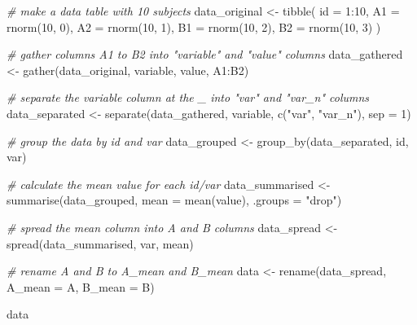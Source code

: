 \documentclass[
  oneside]{book}
\newenvironment{Shaded}{\begin{snugshade}}{\end{snugshade}}
\newcommand{\AttributeTok}[1]{\textcolor[rgb]{0.77,0.63,0.00}{#1}}
\newcommand{\CommentTok}[1]{\textcolor[rgb]{0.56,0.35,0.01}{\textit{#1}}}
\newcommand{\DecValTok}[1]{\textcolor[rgb]{0.00,0.00,0.81}{#1}}
\newcommand{\FunctionTok}[1]{\textcolor[rgb]{0.00,0.00,0.00}{#1}}
\newcommand{\NormalTok}[1]{#1}
\newcommand{\OtherTok}[1]{\textcolor[rgb]{0.56,0.35,0.01}{#1}}
\newcommand{\SpecialCharTok}[1]{\textcolor[rgb]{0.00,0.00,0.00}{#1}}
\newcommand{\StringTok}[1]{\textcolor[rgb]{0.31,0.60,0.02}{#1}}
\begin{document}
\begin{Shaded}
\begin{Highlighting}[]
\CommentTok{\# make a data table with 10 subjects}
\NormalTok{data\_original }\OtherTok{\textless{}{-}} \FunctionTok{tibble}\NormalTok{(}
  \AttributeTok{id =} \DecValTok{1}\SpecialCharTok{:}\DecValTok{10}\NormalTok{,}
  \AttributeTok{A1 =} \FunctionTok{rnorm}\NormalTok{(}\DecValTok{10}\NormalTok{, }\DecValTok{0}\NormalTok{),}
  \AttributeTok{A2 =} \FunctionTok{rnorm}\NormalTok{(}\DecValTok{10}\NormalTok{, }\DecValTok{1}\NormalTok{),}
  \AttributeTok{B1 =} \FunctionTok{rnorm}\NormalTok{(}\DecValTok{10}\NormalTok{, }\DecValTok{2}\NormalTok{),}
  \AttributeTok{B2 =} \FunctionTok{rnorm}\NormalTok{(}\DecValTok{10}\NormalTok{, }\DecValTok{3}\NormalTok{)}
\NormalTok{)}

\CommentTok{\# gather columns A1 to B2 into "variable" and "value" columns}
\NormalTok{data\_gathered }\OtherTok{\textless{}{-}} \FunctionTok{gather}\NormalTok{(data\_original, variable, value, A1}\SpecialCharTok{:}\NormalTok{B2)}

\CommentTok{\# separate the variable column at the \_ into "var" and "var\_n" columns}
\NormalTok{data\_separated }\OtherTok{\textless{}{-}} \FunctionTok{separate}\NormalTok{(data\_gathered, variable, }\FunctionTok{c}\NormalTok{(}\StringTok{"var"}\NormalTok{, }\StringTok{"var\_n"}\NormalTok{), }\AttributeTok{sep =} \DecValTok{1}\NormalTok{)}

\CommentTok{\# group the data by id and var}
\NormalTok{data\_grouped }\OtherTok{\textless{}{-}} \FunctionTok{group\_by}\NormalTok{(data\_separated, id, var)}

\CommentTok{\# calculate the mean value for each id/var }
\NormalTok{data\_summarised }\OtherTok{\textless{}{-}} \FunctionTok{summarise}\NormalTok{(data\_grouped, }\AttributeTok{mean =} \FunctionTok{mean}\NormalTok{(value), }\AttributeTok{.groups =} \StringTok{"drop"}\NormalTok{)}

\CommentTok{\# spread the mean column into A and B columns}
\NormalTok{data\_spread }\OtherTok{\textless{}{-}} \FunctionTok{spread}\NormalTok{(data\_summarised, var, mean)}

\CommentTok{\# rename A and B to A\_mean and B\_mean}
\NormalTok{data }\OtherTok{\textless{}{-}} \FunctionTok{rename}\NormalTok{(data\_spread, }\AttributeTok{A\_mean =}\NormalTok{ A, }\AttributeTok{B\_mean =}\NormalTok{ B)}

\NormalTok{data}
\end{Highlighting}
\end{Shaded}
\end{document}
